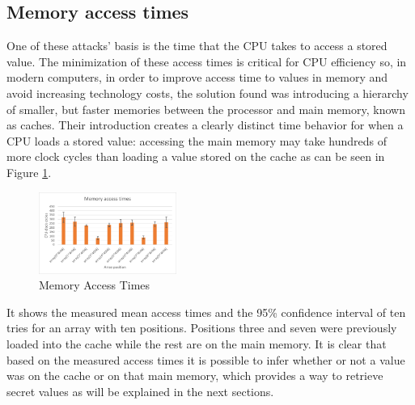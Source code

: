 \documentclass[conference]{IEEEtran}
\begin{document}

\subsection{Memory access times}

One of these attacks' basis is the time that the CPU takes to access a stored value. The minimization of these access times is critical for CPU efficiency so, in modern computers, in order to improve  access time to values in memory and avoid increasing technology costs, the solution found was introducing a hierarchy of smaller, but faster memories between the processor and main memory, known as caches. Their introduction creates a clearly distinct time behavior for when a CPU loads a stored value: accessing the main memory may take hundreds of more clock cycles than loading a value stored on the cache as can be seen in Figure \ref{fig:memAccess}.
\begin{figure}[h]
  \centering
  \includegraphics[width=0.4\textwidth]{figures/Memory_Access.png}
  \caption{Memory Access Times}
  \label{fig:memAccess}
\end{figure}
It shows the measured mean access times and the 95\% confidence interval of ten tries for an array with ten positions. Positions three and seven were previously loaded into the cache while the rest are on the main memory. It is clear that based on the measured access times it is possible to infer whether or not a value was on the cache or on that main memory, which provides a way to retrieve secret values as will be explained in the next sections.
\end{document}
